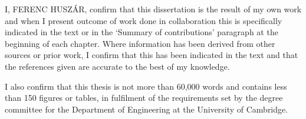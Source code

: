 \begin{declaration} %

I, FERENC HUSZ\'{A}R, confirm that this dissertation is the result of my own work and when I present outcome of work done in collaboration this is speciﬁcally indicated in the text or in the `Summary of contributions' paragraph at the beginning of each chapter. Where information has been derived from other sources or prior work, I confirm that this has been indicated in the text and that the references given are accurate to the best of my knowledge.

I also confirm that this thesis is not more than 60,000 words and contains less than 150 figures or tables, in fulfilment of the requirements set by the degree committee for the Department of Engineering at the University of Cambridge.

\end{declaration}